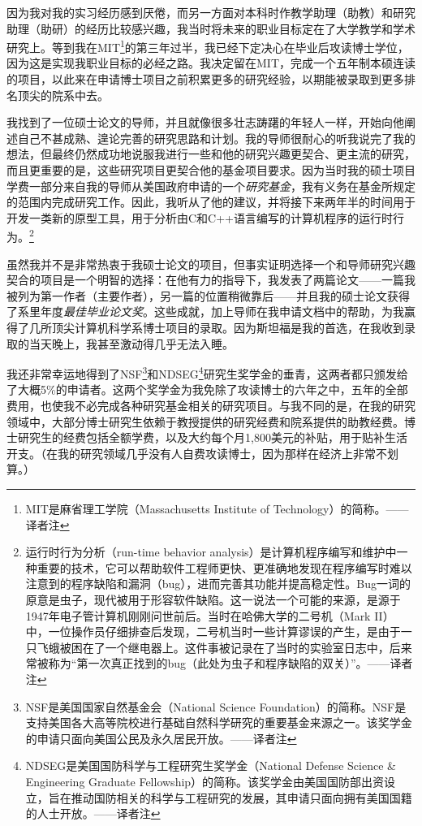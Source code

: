 \documentclass[letter,12pt]{book}
\begin{document}
\begin{CJK}{UTF8}{gbsn}
因为我对我的实习经历感到厌倦，而另一方面对本科时作教学助理（助教）和研究助理（助研）的经历比较感兴趣，我当时将未来的职业目标定在了大学教学和学术研究上。等到我在MIT\footnote{MIT是麻省理工学院（Massachusetts Institute of Technology）的简称。——译者注}的第三年过半，我已经下定决心在毕业后攻读博士学位，因为这是实现我职业目标的必经之路。我决定留在MIT，完成一个五年制本硕连读的项目，以此来在申请博士项目之前积累更多的研究经验，以期能被录取到更多排名顶尖的院系中去。

我找到了一位硕士论文的导师，并且就像很多壮志踌躇的年轻人一样，开始向他阐述自己不甚成熟、遑论完善的研究思路和计划。我的导师很耐心的听我说完了我的想法，但最终仍然成功地说服我进行一些和他的研究兴趣更契合、更主流的研究，而且更重要的是，这些研究项目更契合他的基金项目要求。因为当时我的硕士项目学费一部分来自我的导师从美国政府申请的一个\emph{研究基金}，我有义务在基金所规定的范围内完成研究工作。因此，我听从了他的建议，并将接下来两年半的时间用于开发一类新的原型工具，用于分析由C和C++语言编写的计算机程序的运行时行为。\footnote{运行时行为分析（run-time behavior analysis）是计算机程序编写和维护中一种重要的技术，它可以帮助软件工程师更快、更准确地发现在程序编写时难以注意到的程序缺陷和漏洞（bug），进而完善其功能并提高稳定性。Bug一词的原意是虫子，现代被用于形容软件缺陷。这一说法一个可能的来源，是源于1947年电子管计算机刚刚问世前后。当时在哈佛大学的二号机（Mark II）中，一位操作员仔细排查后发现，二号机当时一些计算谬误的产生，是由于一只飞蛾被困在了一个继电器上。这件事被记录在了当时的实验室日志中，后来常被称为“第一次真正找到的bug（此处为虫子和程序缺陷的双关）”。——译者注}

虽然我并不是非常热衷于我硕士论文的项目，但事实证明选择一个和导师研究兴趣契合的项目是一个明智的选择：在他有力的指导下，我发表了两篇论文——一篇我被列为第一作者（主要作者），另一篇的位置稍微靠后——并且我的硕士论文获得了系里年度\emph{最佳毕业论文奖}。这些成就，加上导师在我申请文档中的帮助，为我赢得了几所顶尖计算机科学系博士项目的录取。因为斯坦福是我的首选，在我收到录取的当天晚上，我甚至激动得几乎无法入睡。

我还非常幸运地得到了NSF\footnote{NSF是美国国家自然基金会（National Science Foundation）的简称。NSF是支持美国各大高等院校进行基础自然科学研究的重要基金来源之一。该奖学金的申请只面向美国公民及永久居民开放。——译者注}和NDSEG\footnote{NDSEG是美国国防科学与工程研究生奖学金（National Defense Science \& Engineering  Graduate Fellowship）的简称。该奖学金由美国国防部出资设立，旨在推动国防相关的科学与工程研究的发展，其申请只面向拥有美国国籍的人士开放。——译者注}研究生奖学金的垂青，这两者都只颁发给了大概5\%的申请者。这两个奖学金为我免除了攻读博士的六年之中，五年的全部费用，也使我不必完成各种研究基金相关的研究项目。与我不同的是，在我的研究领域中，大部分博士研究生依赖于教授提供的研究经费和院系提供的助教经费。博士研究生的经费包括全额学费，以及大约每个月1,800美元的补贴，用于贴补生活开支。（在我的研究领域几乎没有人自费攻读博士，因为那样在经济上非常不划算。）


\end{CJK}
\end{document}
